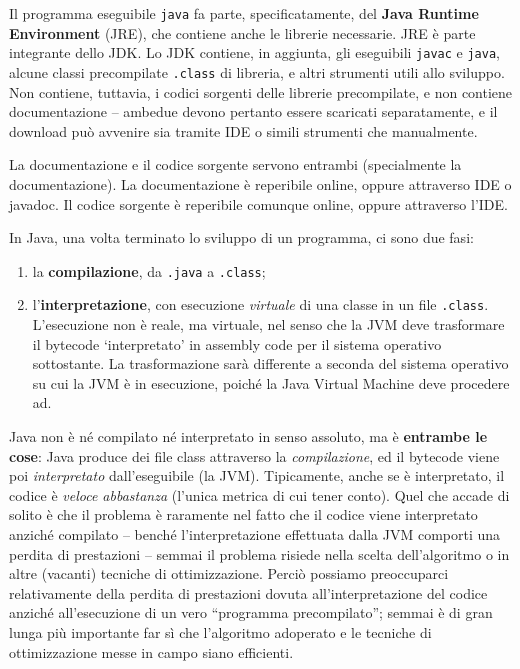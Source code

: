 \documentclass[\fontsizeclass,twocolumn]{\classname}
\theoremstyle{definition}
\theoremstyle{definition}
\begin{document}
Il programma eseguibile \texttt{java} fa parte, specificatamente, del
\textbf{Java Runtime Environment} (JRE), che contiene anche le librerie
necessarie. JRE è parte integrante dello JDK. Lo JDK contiene, in aggiunta, gli
eseguibili \texttt{javac} e \texttt{java}, alcune classi precompilate
\texttt{.class} di libreria, e altri strumenti utili allo sviluppo. Non
contiene, tuttavia, i codici sorgenti delle librerie precompilate, e non
contiene documentazione \--- ambedue devono pertanto essere scaricati
separatamente, e il download può avvenire sia tramite IDE o simili strumenti
che manualmente.

La documentazione e il codice sorgente servono entrambi (specialmente la
documentazione). La documentazione è reperibile online, oppure attraverso IDE o
javadoc. Il codice sorgente è reperibile comunque online, oppure attraverso
l'IDE.

In Java, una volta terminato lo sviluppo di un programma, ci sono due fasi:
\begin{enumerate}
	\item la \textbf{compilazione}, da \texttt{.java} a \texttt{.class};
	\item l'\textbf{interpretazione}, con esecuzione \emph{virtuale} di una
		classe in un file \texttt{.class}. L'esecuzione non è reale, ma
		virtuale, nel senso che la JVM deve trasformare il bytecode
		`interpretato' in assembly code per il sistema operativo sottostante. La
		trasformazione sarà differente a seconda del sistema operativo su cui la
		JVM è in esecuzione, poiché la Java Virtual Machine deve procedere ad.
\end{enumerate}

Java non è né compilato né interpretato in senso assoluto, ma è
\textbf{entrambe le cose}: Java produce dei file class attraverso la
\emph{compilazione}, ed il bytecode viene poi \emph{interpretato}
dall'eseguibile (la JVM). Tipicamente, anche se è interpretato, il codice è
\emph{veloce abbastanza} (l'unica metrica di cui tener conto). Quel che accade
di solito è che il problema è raramente nel fatto che il codice viene
interpretato anziché compilato -- benché l'interpretazione effettuata dalla JVM
comporti una perdita di prestazioni -- semmai il problema risiede nella scelta
dell'algoritmo o in altre (vacanti) tecniche di ottimizzazione. Perciò possiamo
preoccuparci relativamente della perdita di prestazioni dovuta
all'interpretazione del codice anziché all'esecuzione di un vero ``programma
precompilato''; semmai è di gran lunga più importante far sì che l'algoritmo
adoperato e le tecniche di ottimizzazione messe in campo siano efficienti.
\end{document}
